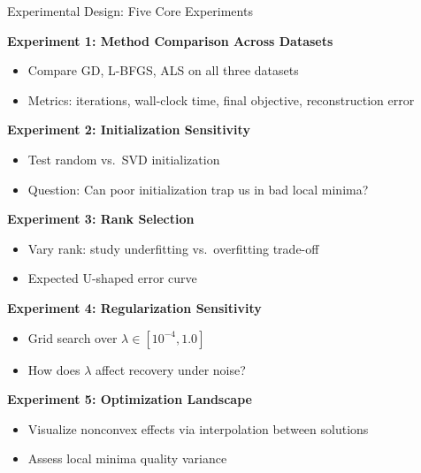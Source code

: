 \documentclass[aspectratio=169,usenames,dvipsnames]{beamer}
\begin{document}
\begin{frame}{Experimental Design: Five Core Experiments}
    
    \textbf{Experiment 1: Method Comparison Across Datasets}
    \begin{itemize}
        \item Compare GD, L-BFGS, ALS on all three datasets
        \item Metrics: iterations, wall-clock time, final objective, reconstruction error
    \end{itemize}
    
    \vspace{0.3cm}
    
    \textbf{Experiment 2: Initialization Sensitivity}
    \begin{itemize}
        \item Test random vs.\ SVD initialization
        \item Question: Can poor initialization trap us in bad local minima?
    \end{itemize}
    
    \vspace{0.3cm}
    
    \textbf{Experiment 3: Rank Selection}
    \begin{itemize}
        \item Vary rank: study underfitting vs.\ overfitting trade-off
        \item Expected U-shaped error curve
    \end{itemize}
    
    \vspace{0.3cm}
    
    \textbf{Experiment 4: Regularization Sensitivity}
    \begin{itemize}
        \item Grid search over $\lambda \in [10^{-4}, 1.0]$
        \item How does $\lambda$ affect recovery under noise?
    \end{itemize}
    
    \vspace{0.3cm}
    
    \textbf{Experiment 5: Optimization Landscape}
    \begin{itemize}
        \item Visualize nonconvex effects via interpolation between solutions
        \item Assess local minima quality variance
    \end{itemize}
\end{frame}
\end{document}
